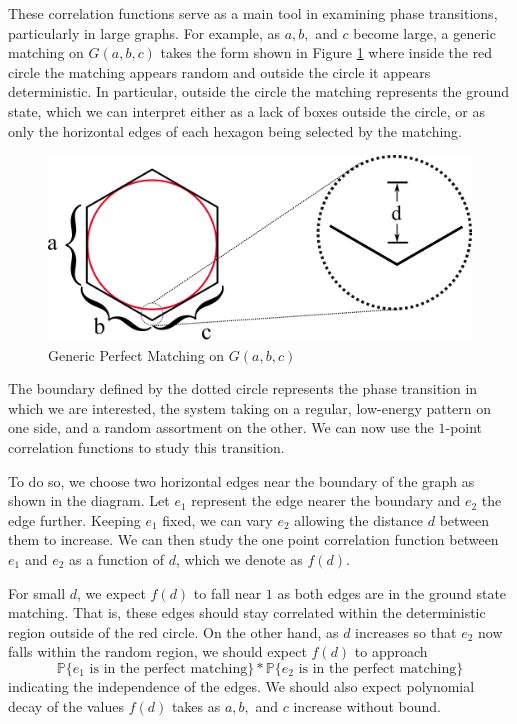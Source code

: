 \documentclass{article}
\begin{document}
These correlation functions serve as a main tool in examining phase transitions, particularly in large graphs. For example, as $a,b,$ and $c$ become large, a generic matching on $G(a,b,c)$ takes the form shown in Figure \ref{fig:gen_hex} where inside the red circle the matching appears random and outside the circle it appears deterministic. In particular, outside the circle the matching represents the ground state, which we can interpret either as a lack of boxes outside the circle, or as only the horizontal edges of each hexagon being selected by the matching. 
	\begin{figure}[h]
\begin{minipage}{\textwidth}
	\begin{center}
 	\includegraphics[width=\textwidth]{generic_hex.png}
  	\caption{Generic Perfect Matching on $G(a,b,c)$}
	 \label{fig:gen_hex}
 	 \end{center}
 \end{minipage}	
\end{figure} 	
	
	The boundary defined by the dotted circle represents the phase transition in which we are interested, the system taking on a regular, low-energy pattern on one side, and a random assortment on the other. We can now use the $1$-point correlation functions to study this transition. 
	
	To do so, we choose two horizontal edges near the boundary of the graph as shown in the diagram. Let $e_1$ represent the edge nearer the boundary and $e_2$ the edge further. Keeping $e_1$ fixed, we can vary $e_2$ allowing the distance $d$ between them to increase. We can then study the one point correlation function between $e_1$ and $e_2$ as a function of $d$, which we denote as $f(d)$. 
	
	For small $d$, we expect $f(d)$ to fall near $1$ as both edges are in the ground state matching. That is, these edges should stay correlated within the deterministic region outside of the red circle. On the other hand, as $d$ increases so that $e_2$ now falls within the random region, we should expect $f(d)$ to approach
	$$
	\mathbb{P}\{e_1\text{ is in the perfect matching}\} * \mathbb{P}\{e_2\text{ is in the perfect matching}\}
	$$
	indicating the independence of the edges. We should also expect polynomial decay of the values $f(d)$ takes as $a,b,$ and $c$ increase without bound. 
	
	 
	
	
	
	
	
	
\end{document}

